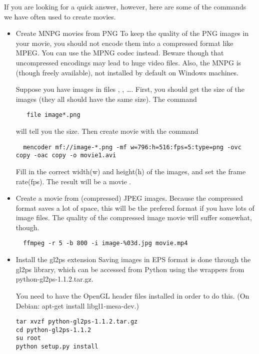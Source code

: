 \begin{enumerate}
If you are looking for a quick answer, however, here are some of the commands we have often used to create movies.
\begin{itemize}
\item Create MNPG movies from PNG
To keep the quality of the PNG images in your movie, you should not encode them into a compressed format like MPEG. You can use the MPNG codec instead. Beware though that uncompressed encodings may lead to huge video files. Also, the MNPG is (though freely available), not installed by default on Windows machines.

Suppose you have images in files , , \dots.
First, you should get the size of the images (they all should have the same size). The command 
\begin{verbatim}
   file image*.png
\end{verbatim}
 will tell you the size. Then create movie with the command
\begin{verbatim}
  mencoder mf://image-*.png -mf w=796:h=516:fps=5:type=png -ovc copy -oac copy -o movie1.avi
\end{verbatim}
Fill in the correct width(w) and height(h) of the images, and set the frame rate(fps). The result will be a movie .


\item Create a movie from (compressed) JPEG images.
Because the compressed format saves a lot of space, this will be the prefered format if you have lots of image files. The quality of the compressed image movie will suffer somewhat, though.
\begin{verbatim}
  ffmpeg -r 5 -b 800 -i image-%03d.jpg movie.mp4
\end{verbatim}


\item Install the gl2ps extension
Saving images in EPS format is done through the gl2ps library, which can be accessed from Python using the wrappers from python-gl2ps-1.1.2.tar.gz.

You need to have the OpenGL header files installed in order to do this. (On Debian: apt-get install libgl1-mesa-dev.)

\begin{verbatim}
tar xvzf python-gl2ps-1.1.2.tar.gz
cd python-gl2ps-1.1.2
su root
python setup.py install
\end{verbatim}

\end{itemize}
\end{enumerate}


